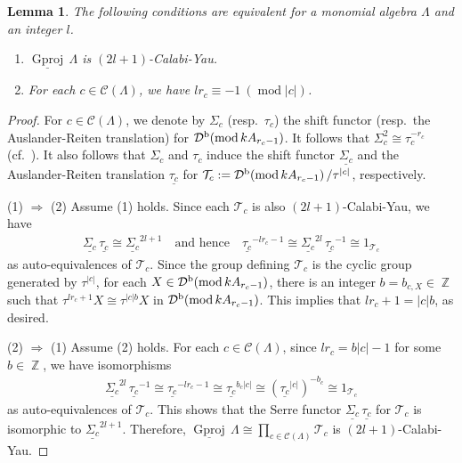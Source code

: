 \documentclass[12pt]{amsart}
\numberwithin{equation}{subsection}
\theoremstyle{plain}
\newtheorem{lemma}[theorem]{Lemma}
\theoremstyle{definition}
\renewcommand{\mod}{\mathrm{mod}\,}
\newcommand{\sGproj}{\underline{\operatorname{Gproj}}\,}
\newcommand{\Z}{\operatorname{\mathbb{Z}}\nolimits}
\renewcommand{\L}{\Lambda}
\newcommand{\T}{\mathcal{T}}
\newcommand{\D}{\mathcal{D}}
\newcommand{\C}{\mathcal{C}}
\begin{document}
\begin{lemma}\label{claim_34}
The following conditions are equivalent for a monomial algebra $\L$ and an integer $l$.
\begin{enumerate}
\item $\sGproj\L$ is $(2l+1)$-Calabi-Yau.
\item For each $c\in\C(\L)$, we have  $l r_c \equiv -1 \ (\operatorname{mod} |c|)$.
\end{enumerate}
\end{lemma}
\begin{proof}
For $c\in\C(\L)$, we denote by $\Sigma_c$ (resp.~$\tau_c$) the shift functor (resp.~the Auslander-Reiten translation) for $\D^{\rm b}\!\left(\mod k A_{r_c -1}\right)$.
It follows that $\Sigma_c^2 \cong \tau_c^{-r_c}$ (cf.~\cite[8.3]{Keller_2005}).
It also follows that $\Sigma_c$ and $\tau_c$ induce the shift functor $\underline{\Sigma_c}$ and  the Auslander-Reiten translation $\underline{\tau_c}$ for $\T_c := \D^{\rm b}\!\left(\mod k A_{r_c -1}\right)/\tau^{|c|}$, respectively.



(1) $\Rightarrow$ (2)
Assume (1) holds.
Since each $\T_c$ is also $(2l+1)$-Calabi-Yau, we have 
\begin{align}
\underline{\Sigma_c}\,\underline{\tau_c} \cong \underline{\Sigma_c}^{2l+1}
\quad\text{and hence}\quad
\underline{\tau_c}^{-lr_c-1}\cong \underline{\Sigma_c}^{2l}\,\underline{\tau_c}^{-1} \cong 1_{\T_c}
\end{align}
as auto-equivalences of $\T_c$.
Since the group defining $\T_c$ is the cyclic group generated by $\tau^{|c|}$, for each $X\in\D^{\rm b}\!\left(\mod k A_{r_c -1}\right)$, there is an integer $b=b_{c, X}\in\Z$ such that  $\tau^{lr_c+1}X \cong \tau^{|c| b}X$ in $\D^{\rm b}\!\left(\mod k A_{r_c -1}\right)$.
This implies that $lr_c+1 = |c| b$, as desired.




(2) $\Rightarrow$ (1)
Assume (2) holds.
For each $c\in\C(\L)$, since $l r_c =b|c| -1$ for some $b\in \Z$, we have isomorphisms
\begin{align}
\underline{\Sigma_c}^{2l}\,\underline{\tau_c}^{-1} \cong \underline{\tau_c}^{-lr_c-1} \cong \underline{\tau_c}^{b_c|c|} \cong (\underline{\tau_c}^{|c|})^{-b_c} \cong 1_{\T_c}
\end{align}
as auto-equivalences of $\T_c$.
This shows that the Serre functor $\underline{\Sigma_c}\,\underline{\tau_c}$ for $\T_c$ is isomorphic to $\underline{\Sigma_c}^{2l+1}$.
Therefore, $\sGproj\L \cong \prod_{c \in \C(\L)} \T_c$ is $(2l+1)$-Calabi-Yau.
\end{proof}
\end{document}
